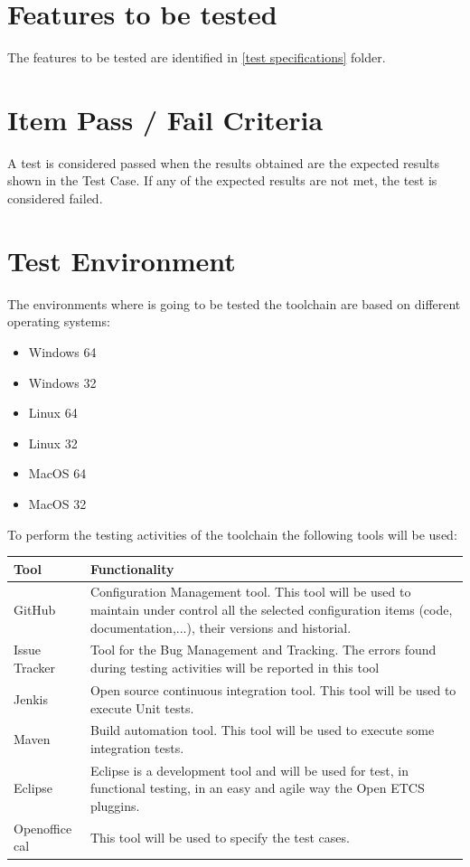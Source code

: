 \section{Features to be tested}
\label{sec:features_test}

The features to be tested are identified in \href{https://github.com/openETCS/toolchain/tree/master/tool/bundles}{[test specifications]} folder.


\section{Item Pass / Fail Criteria}
A test is considered passed when the results obtained are the expected results shown in the Test Case. If any of the expected results are not met, the test is considered failed.

\section{Test Environment}
The environments where is going to be tested the toolchain are based on different operating systems:
\begin{itemize}
\item Windows 64
\item Windows 32
\item Linux 64
\item Linux 32
\item MacOS 64
\item MacOS 32
\end{itemize}

To perform the testing activities of the toolchain the following tools will be used:

\begin{center}
\begin{longtable}{|p{2cm}|p{8cm}|}\hline
\textbf{Tool} & \textbf{Functionality}\\\hline
GitHub & Configuration Management tool. This tool will be used to maintain under control all the selected configuration items (code, documentation,...), their versions and historial.\\\hline
Issue Tracker & Tool for the Bug Management and Tracking. The errors found during testing activities will be reported in this tool\\\hline
Jenkis & Open source continuous integration tool. This tool will be used to execute Unit tests.\\\hline
Maven &  Build automation tool. This tool will be used to execute some integration tests.\\\hline
Eclipse & Eclipse is a development tool and will be used for test, in functional testing, in an easy and agile way the Open ETCS pluggins.\\\hline
Openoffice cal & This tool will be used to specify the test cases.\\\hline
\end{longtable}
\end{center}

